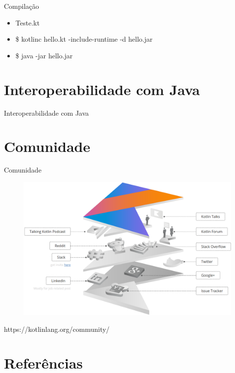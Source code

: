 \documentclass{beamer}
\begin{document}
\begin{frame}{Compilação}
	\begin{itemize}
		\item Teste.kt
		\item \$ kotlinc hello.kt -include-runtime -d hello.jar
		\item \$ java -jar hello.jar
	\end{itemize}
\end{frame}

\section{Interoperabilidade com Java}
	\begin{frame}{Interoperabilidade com Java}
	
	\end{frame}



\section{Comunidade}

	\begin{frame}{Comunidade}
	
		\begin{figure}[!htb]
			\centering
			\includegraphics[scale=.23]{comunidade.png}
		\end{figure}
	
	https://kotlinlang.org/community/
	
	\end{frame}





\section{Referências}
	
\end{document}
